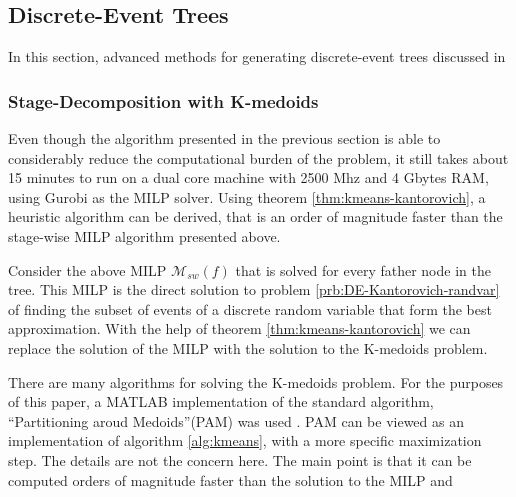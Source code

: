 \subsection{Discrete-Event Trees}
In this section, advanced methods for generating discrete-event trees discussed in
\subsubsection{Stage-Decomposition with K-medoids}
Even though the algorithm presented in the previous section is able to considerably reduce the computational burden of the problem, it still takes about 15 minutes to run on a dual core machine with 2500 Mhz and 4 Gbytes RAM, using Gurobi as the MILP solver.
Using theorem \ref{thm:kmeans-kantorovich}, a heuristic algorithm can be derived, that is an order of magnitude faster than the stage-wise MILP algorithm presented above.

Consider the above MILP $\mathcal{M}_{sw}(f)$ that is solved for every father node in the tree.
This MILP is the direct solution to problem \ref{prb:DE-Kantorovich-randvar} of finding the subset of events of a discrete random variable that form the best approximation.
With the help of theorem \ref{thm:kmeans-kantorovich} we can replace the solution of the MILP with the solution to the K-medoids problem.

There are many algorithms for solving the K-medoids problem.
For the purposes of this paper, a MATLAB implementation of the standard algorithm, ``Partitioning aroud Medoids''(PAM) was used \cite{Kaufman1987}.
PAM can be viewed as an implementation of algorithm \ref{alg:kmeans}, with a more specific maximization step. The details are not the concern here. The main point is that it can be computed orders of magnitude faster than the solution to the MILP and 

